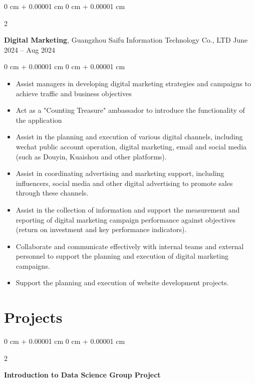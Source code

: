 \documentclass[10pt, letterpaper]{article}
\newenvironment{highlights}{
    \begin{itemize}[
        topsep=0.10 cm,
        parsep=0.10 cm,
        partopsep=0pt,
        itemsep=0pt,
        leftmargin=0 cm + 10pt
    ]
}{
    \end{itemize}
} %
\newenvironment{onecolentry}{
    \begin{adjustwidth}{
        0 cm + 0.00001 cm
    }{
        0 cm + 0.00001 cm
    }
}{
    \end{adjustwidth}
} %
\newenvironment{twocolentry}[2][]{
    \onecolentry
    \def\secondColumn{#2}
    \setcolumnwidth{\fill, 4.5 cm}
    \begin{paracol}{2}
}{
    \switchcolumn \raggedleft \secondColumn
    \end{paracol}
    \endonecolentry
} %
\begin{document}
        \vspace{0.2 cm}
        \begin{twocolentry}{
            June 2024 – Aug 2024
        }
\textbf{Digital Marketing}, Guangzhou Saifu Information Technology Co., LTD\end{twocolentry}

        \vspace{0.10 cm}
        \begin{onecolentry}
            \begin{highlights}
                \item Assist managers in developing digital marketing strategies and campaigns to achieve traffic and business objectives
                \item Act as a "Counting Treasure" ambassador to introduce the functionality of the application
                \item Assist in the planning and execution of various digital channels, including wechat public account operation, digital marketing, email and social media (such as Douyin, Kuaishou and other platforms).
                \item Assist in coordinating advertising and marketing support, including influencers, social media and other digital advertising to promote sales through these channels.
                \item Assist in the collection of information and support the measurement and reporting of digital marketing campaign performance against objectives (return on investment and key performance indicators).
                \item Collaborate and communicate effectively with internal teams and external personnel to support the planning and execution of digital marketing campaigns.
                \item Support the planning and execution of website development projects.
            \end{highlights}
        \end{onecolentry}



    
    \section{Projects}



        
        \begin{twocolentry}{
            
        }
            \textbf{Introduction to Data Science Group Project}\end{twocolentry}
\end{document}
